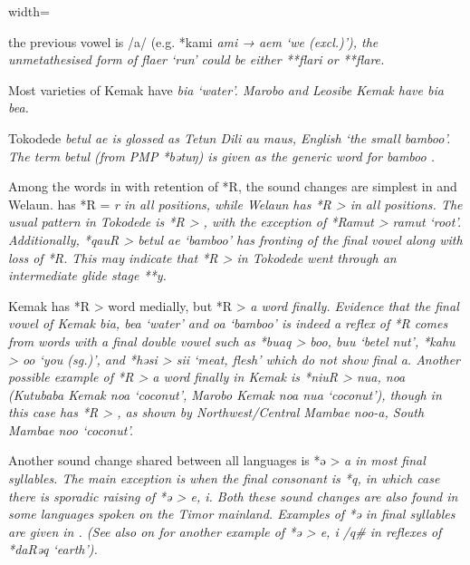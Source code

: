 \begin{table}[p]
\begin{adjustbox}{width=\textwidth}
\begin{threeparttable}
\begin{tablenotes}
{								the previous vowel is /a/ (e.g.
								*kami \it{ami → aem} ‘we (excl.)’),
								the unmetathesised form of \it{flaer} ‘run’ could be either **flari or **flare.}
			\item[Δ]	{Most varieties of Kemak have \it{bia} ‘water’.
								Marobo and Leosibe Kemak have \it{bia {\tl} bea}.}
			\item[{ǁ}]	{Tokodede \it{betul ae} is glossed as Tetun Dili \it{au
								maus}, English ‘the small bamboo’.
								The term \it{betul} (from PMP *bətuŋ) is given as the generic
								word for bamboo \citep[4]{LSG2006}.}
		\end{tablenotes}
	\end{threeparttable}
\end{adjustbox}
\end{table}

Among the words in  with retention of *R,
the sound changes are simplest in  and Welaun.
 has *R = \it{r} in all positions,
while Welaun has *R > {\0} in all positions.
The usual pattern in Tokodede is *R > {\0},
with the exception of *Ramut > \it{ramut} ‘root’.
Additionally, *qauR > \it{betul ae} `bamboo' has fronting
of the final vowel along with loss of *R.
This may indicate that *R > {\0} in Tokodede went through an
intermediate glide stage **y.

Kemak has *R > {\0} word medially,
but *R > \it{a} word finally.
Evidence that the final vowel of Kemak \it{bia,
bea} ‘water’ and \it{oa} ‘bamboo’ is indeed a reflex of *R comes
from words with a final double vowel such as *buaq > \it{boo,
buu} ‘betel nut’, *kahu > \it{oo} ‘you (sg.)’,
and *həsi > \it{sii} ‘meat,
flesh’ which do not show final \it{a}.
Another possible example of *R > \it{a} word finally in Kemak
is *niuR > \it{nua,
noa} (Kutubaba Kemak \it{noa} ‘coconut’,
Marobo Kemak \it{noa {\tl} nua} ‘coconut’),
though in this case  has *R > {\0},
as shown by Northwest/Central Mambae \it{noo-a},
South Mambae \it{noo} ‘coconut’.

Another sound change shared between all  languages
is *ə > \it{a} in most final syllables.
The main exception is when the final consonant is *q,
in which case there is sporadic raising of *ə > \it{e, i}.
Both these sound changes are also found in some 
languages spoken on the Timor mainland.
Examples of *ə in final syllables are given in . (See
also  on  for another example of *ə > \it{e,
i} /{\gap}q{\#} in reflexes of *daRəq ‘earth’).


